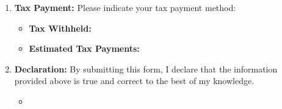 \documentclass{article}
\begin{document}
\begin{Form}
\begin{enumerate}[label=\textbf{\arabic*.}, align=left, leftmargin=*]
    \item \textbf{Tax Payment:}
    Please indicate your tax payment method:
    \begin{itemize}[label={}, leftmargin=*]
        \item \textbf{Tax Withheld:} 
        \item \textbf{Estimated Tax Payments:} 
    \end{itemize}
    
    \item \textbf{Declaration:}
    By submitting this form, I declare that the information provided above is true and correct to the best of my knowledge.
    \begin{itemize}[label={}, leftmargin=*]
        \item {} 
    \end{itemize}
\end{enumerate}
\end{Form}
\end{document}
